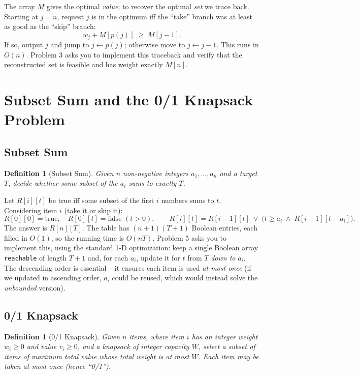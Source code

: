 \documentclass[11pt]{article}
\newtheorem{definition}[theorem]{Definition}
\begin{document}
The array $M$ gives the optimal \emph{value}; to recover the optimal \emph{set} we trace
back. Starting at $j = n$, request $j$ is in the optimum iff the ``take'' branch was at
least as good as the ``skip'' branch:
\[
w_j + M[p(j)] \;\ge\; M[j-1].
\]
If so, output $j$ and jump to $j \gets p(j)$; otherwise move to $j \gets j-1$. This runs in
$O(n)$. Problem 3 asks you to implement this traceback and verify that the reconstructed
set is feasible and has weight exactly $M[n]$.

\section{Subset Sum and the 0/1 Knapsack Problem}

\subsection{Subset Sum}

\begin{definition}[Subset Sum]
Given $n$ non-negative integers $a_1, \ldots, a_n$ and a target $T$, decide whether some
subset of the $a_i$ sums to exactly $T$.
\end{definition}

Let $R[i][t]$ be true iff some subset of the first $i$ numbers sums to $t$. Considering
item $i$ (take it or skip it):
\[
R[0][0] = \text{true}, \quad R[0][t] = \text{false } (t>0), \qquad
R[i][t] = R[i-1][t] \;\lor\; \bigl(t \ge a_i \;\land\; R[i-1][t - a_i]\bigr).
\]
The answer is $R[n][T]$. The table has $(n+1)(T+1)$ Boolean entries, each filled in $O(1)$,
so the running time is $O(nT)$. Problem 5 asks you to implement this, using the standard
1-D optimization: keep a single Boolean array \texttt{reachable} of length $T+1$ and, for
each $a_i$, update it for $t$ from $T$ \emph{down to} $a_i$. The descending order is
essential -- it ensures each item is used \emph{at most once} (if we updated in ascending
order, $a_i$ could be reused, which would instead solve the \emph{unbounded} version).

\subsection{0/1 Knapsack}

\begin{definition}[0/1 Knapsack]
Given $n$ items, where item $i$ has an integer weight $w_i \ge 0$ and value $v_i \ge 0$,
and a knapsack of integer capacity $W$, select a subset of items of \emph{maximum total
value} whose total weight is at most $W$. Each item may be taken at most once (hence
``0/1'').
\end{definition}
\end{document}
